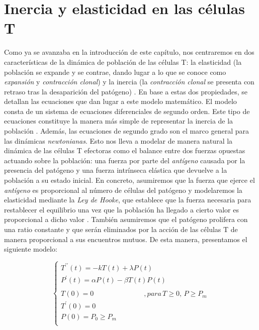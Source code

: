 \section{Inercia y elasticidad en las células T}
\label{sec:iner_elast}


Como ya se avanzaba en la introducción de este capítulo, nos centraremos en dos características de la dinámica de población de las células T: la elasticidad (la población se expande y se contrae, dando lugar a lo que se conoce como \textit{expansión} y \textit{contracción clonal}) y la inercia (la \textit{contracción clonal} se presenta con retraso tras la desaparición del patógeno) \citep{arias2015growth}. En base a estas dos propiedades, se detallan las ecuaciones que dan lugar a este modelo matemático. El modelo consta de un sistema de ecuaciones diferenciales de segundo orden. Este tipo de ecuaciones constituye la manera más simple de representar la inercia de la población \citep{arias2015growth}. Además, las ecuaciones de segundo grado son el marco general para las dinámicas \textit{newtonianas}. Esto nos lleva a modelar de manera natural la dinámica de las células T efectoras como el balance entre dos fuerzas opuestas actuando sobre la población: una fuerza por parte del \textit{antígeno} causada por la presencia del patógeno y una fuerza intrínseca elástica que devuelve a la población a su estado inicial. En concreto, asumiremos que la fuerza que ejerce el \textit{antígeno} es proporcional al número de células del patógeno y modelaremos la elasticidad mediante la \textit{Ley de Hooke}, que establece que la fuerza necesaria para restablecer el equilibrio una vez que la población ha llegado a cierto valor es proporcional a dicho valor \citep{arias2015growth}. También asumiremos que el patógeno prolifera con una ratio constante y que serán eliminados por la acción de las células T de manera proporcional a sus encuentros mutuos. De esta manera, presentamos el siguiente modelo:

\begin{equation}
	\label{sist_macro}
	\left\{ \begin{array}{l}
	{T^{\prime\prime}}(t) = -kT(t) + \lambda P(t) \\
	{P^{\prime}}(t) = \alpha P(t) - \beta T(t)P(t) \\
	\\
	T(0)=0 \hspace{3cm} ,para\, T \geq 0,\, P \geq P_m \\
	T^{\prime}(0)=0  \\
	P(0)=P_0 \geq P_m  \\ 
	\end{array}
	\right.
\end{equation}

